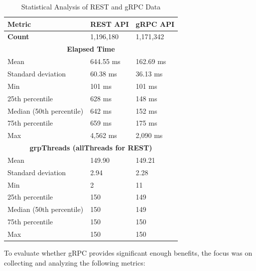 \begin{table}[htbp]
\centering
\caption{Statistical Analysis of REST and gRPC Data}
\label{tab:rest_grpc_statistics}
\begin{tabular}{|l|l|l|}
\hline
\textbf{Metric} & \textbf{REST API} & \textbf{gRPC API} \\ \hline
\textbf{Count} & 1,196,180 & 1,171,342 \\ \hline
\multicolumn{3}{|c|}{\textbf{Elapsed Time}} \\ \hline
Mean & 644.55 ms & 162.69 ms \\ \hline
Standard deviation & 60.38 ms & 36.13 ms \\ \hline
Min & 101 ms & 101 ms \\ \hline
25th percentile & 628 ms & 148 ms \\ \hline
Median (50th percentile) & 642 ms & 152 ms \\ \hline
75th percentile & 659 ms & 175 ms \\ \hline
Max & 4,562 ms & 2,090 ms \\ \hline
\multicolumn{3}{|c|}{\textbf{grpThreads (allThreads for REST)}} \\ \hline
Mean & 149.90 & 149.21 \\ \hline
Standard deviation & 2.94 & 2.28 \\ \hline
Min & 2 & 11 \\ \hline
25th percentile & 150 & 149 \\ \hline
Median (50th percentile) & 150 & 149 \\ \hline
75th percentile & 150 & 150 \\ \hline
Max & 150 & 150 \\ \hline
\end{tabular}
\end{table}

To evaluate whether gRPC provides significant enough benefits, the focus was on collecting and analyzing the following metrics:

